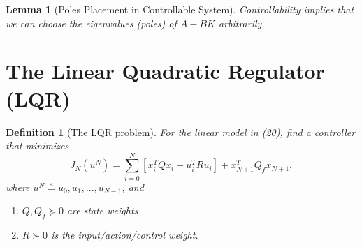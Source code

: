 \documentclass[a4 paper]{article}
\numberwithin{equation}{section}
\theoremstyle{boldStyle}
\theoremstyle{boldBlueStyle}
\newtheorem{lemma}{Lemma}[section]
\theoremstyle{boldPurpleStyle}
\theoremstyle{boldRedStyle}
\newtheorem{definition}{Definition}[section]
\theoremstyle{boldGreenStyle}
\begin{document}
\begin{lemma}[Poles Placement in Controllable System]
  Controllability implies that we can choose the eigenvalues (poles) of \( A - BK \) arbitrarily.
\end{lemma}





\newpage
\section{The Linear Quadratic Regulator (LQR)}

\begin{definition}[The LQR problem]
  For the linear model in (20), find a controller that minimizes
  \[
  J_N(u^N) = \sum_{i=0}^{N} [x_i^T Q x_i + u_i^T R u_i] + x_{N+1}^T Q_f x_{N+1},
  \]
  where \( u^N \triangleq u_0, u_1, \ldots, u_{N-1} \), and
  \begin{enumerate}
      \item \( Q, Q_f \succeq 0 \) are state weights
      \item \( R \succ 0 \) is the input/action/control weight. 
  \end{enumerate}
\end{definition}
\end{document}
